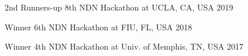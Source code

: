 



\begin{cvhonors}

  \cvhonor
    {2nd Runners-up} %
    {8th NDN Hackathon at UCLA, CA, USA} %
    {2019} %

  \cvhonor
    {Winner} %
    {6th NDN Hackathon at FIU, FL, USA} %
    {2018} %

  \cvhonor
    {Winner} %
    {4th NDN Hackathon at Univ. of Memphis, TN, USA} %
    {2017} %






\end{cvhonors}


